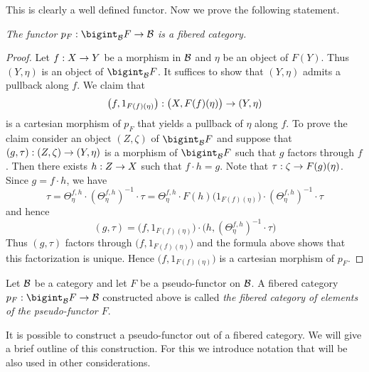This is clearly a well defined functor. Now we prove the following statement.
\begin{flushleft}
\textit{The functor $p_F:\bigint_{\cB}F\ra \cB$ is a fibered category.}
\end{flushleft}
\begin{proof}
Let $f:X\rightarrow Y$ be a morphism in ${\mathcal B}$ and $\eta$ be an object of $F(Y)$. Thus $(Y,\eta)$ is an object of $\bigint_{\cB}F$. It suffices to show that $(Y,\eta)$ admits a pullback along $f$. We claim that
$$\big(f,1_{F(f)(\eta)}\big):\big(X,F(f)(\eta)\big)\rightarrow (Y,\eta)$$
is a cartesian morphism of $p_F$ that yields a pullback of $\eta$ along $f$. To prove the claim consider an object $(Z,\zeta)$ of $\bigint_{\cB}F$ and suppose that $(g,\tau):(Z,\zeta)\rightarrow (Y,\eta)$ is a morphism of $\bigint_{\cB}F$ such that $g$ factors through $f$. Then there exists $h:Z\rightarrow X$ such that $f\cdot h = g$. Note that $\tau:\zeta\rightarrow F(g)(\eta)$. Since $g = f\cdot h$, we have
$$\tau = \Theta^{f,h}_{\eta}\cdot \left(\Theta^{f,h}_{\eta}\right)^{-1}\cdot \tau = \Theta^{f,h}_{\eta}\cdot F(h)\big(1_{F(f)(\eta)}\big) \cdot  \left(\Theta^{f,h}_{\eta}\right)^{-1}\cdot \tau$$
and hence
$$(g,\tau) = \big(f, 1_{F(f)(\eta)} \big) \cdot \bigg(h,\left(\Theta^{f,h}_{\eta}\right)^{-1}\cdot \tau \bigg)$$
Thus $(g,\tau)$ factors through $\big(f,1_{F(f)(\eta)}\big)$ and the formula above shows that this factorization is unique. Hence $\big(f,1_{F(f)(\eta)}\big)$ is a cartesian morphism of $p_F$.
\end{proof}

\begin{definition}
Let ${\mathcal B}$ be a category and let $F$ be a pseudo-functor on ${\mathcal B}$. A fibered category $p_F:\bigint_{\cB}F\ra \cB$ constructed above is called \textit{the fibered category of elements of the pseudo-functor $F$}.
\end{definition}
\noindent
It is possible to construct a pseudo-functor out of a fibered category. We will give a brief outline of this construction. For this we introduce notation that will be also used in other considerations.


